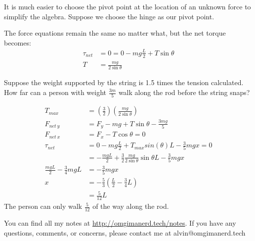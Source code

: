 \documentclass{math}
\begin{document}
It is much easier to choose the pivot point at the location of an unknown force
to simplify the algebra. Suppose we choose the hinge as our pivot point.
\begin{center}
\end{center}
The force equations remain the same no matter what, but the net torque becomes:
\begin{align*}
  \tau_{net} &= 0 = 0-mg\frac{L}{2}+T\sin\theta \\
  T &= \frac{mg}{2\sin\theta}
\end{align*}

Suppose the weight supported by the string is 1.5 times the tension calculated.
How far can a person with weight \( \frac{3m}{5} \) walk along the rod before
the string snaps?
\begin{center}
\end{center}
\begin{align*}
  T_{max} &= \left(\frac{3}{2}\right)\left(\frac{mg}{2\sin\theta}\right) \\
  F_{net~y} &= F_y-mg+T\sin\theta-\frac{3mg}{5} \\
  F_{net~x} &= F_x-T\cos\theta = 0 \\
  \tau_{net} &= 0-mg\frac{L}{2}+T_{max}sin(\theta) L-\frac{3}{5}mgx = 0 \\
  &= -\frac{mgL}{2}+\frac{3}{2}\frac{mg}{2\sin\theta}\sin\theta L-
    \frac{3}{5}mgx \\
  \frac{mgL}{2}-\frac{3}{4}mgL &= -\frac{3}{5}mgx \\
  x &= -\frac{5}{3}\left(\frac{L}{2}-\frac{3}{4}L\right) \\
  &= \frac{5}{12}L
\end{align*}
The person can only walk \( \frac{5}{12} \) of the way along the rod.

\begin{center}
  You can find all my notes at \url{http://omgimanerd.tech/notes}. If you have
  any questions, comments, or concerns, please contact me at
  alvin@omgimanerd.tech
\end{center}
\end{document}
